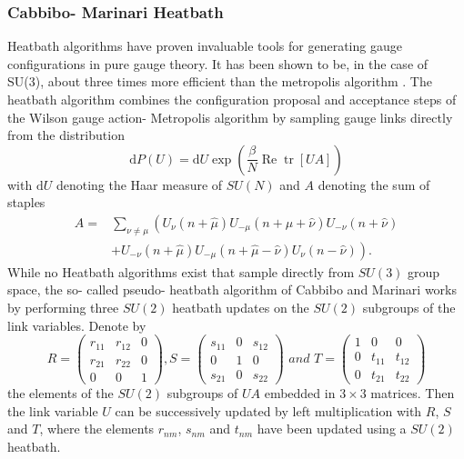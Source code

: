 \documentclass[a4paper,10pt]{article}
\begin{document}
\subsubsection{Cabbibo- Marinari Heatbath}
Heatbath algorithms have proven invaluable tools for generating gauge configurations in pure gauge theory. It has been shown to be, in the case of SU(3), about three times more efficient than the metropolis algorithm \cite{CABIBBO1982387}. The heatbath algorithm combines the configuration proposal and acceptance steps of the Wilson gauge action- Metropolis algorithm by sampling gauge links directly from the distribution
\begin{equation}\label{eq:Heatbath_distribution}
\mathrm{d} P(U)=\mathrm{d} U \exp \left(\frac{\beta}{N} \operatorname{Re} \operatorname{tr}[U A]\right)
\end{equation}
with $\mathrm{d} U$ denoting the Haar measure of $SU(N)$ and $A$ denoting the sum of staples 
\begin{equation}
\begin{aligned}
A=&\sum_{\nu \neq \mu}\left(U_{\nu}(n+\hat{\mu}) U_{-\mu}(n+\hat{\mu}+\hat{\nu}) U_{-\nu}(n+\hat{\nu})\right.\\
&\left.+U_{-\nu}(n+\hat{\mu}) U_{-\mu}(n+\hat{\mu}-\hat{\nu}) U_{\nu}(n-\hat{\nu})\right).
\end{aligned}
\end{equation}
While no Heatbath algorithms exist that sample directly from $SU(3)$ group space, the so- called pseudo- heatbath algorithm of Cabbibo and Marinari \cite{CABIBBO1982387} works by performing three $SU(2)$ heatbath updates on the $SU(2)$ subgroups of the link variables. Denote by 
\begin{equation}
R=\left(\begin{array}{ccc}
r_{11} & r_{12} & 0 \\
r_{21} & r_{22} & 0 \\
0 & 0 & 1
\end{array}\right), S=\left(\begin{array}{ccc}
s_{11} & 0 & s_{12} \\
0 & 1 & 0 \\
s_{21} & 0 & s_{22}
\end{array}\right)\,\, and\,\, T=\left(\begin{array}{ccc}
1 & 0 & 0 \\
0 & t_{11} & t_{12} \\
0 & t_{21} & t_{22}
\end{array}\right)
\end{equation}
the elements of the $SU(2)$ subgroups of $UA$ embedded in $3\times3$ matrices. Then the link variable $U$ can be successively updated by left multiplication with $R$, $S$ and $T$, where the elements $r_{nm}$, $s_{nm}$ and $t_{nm}$ have been updated using a $SU(2)$ heatbath.
\end{document}
